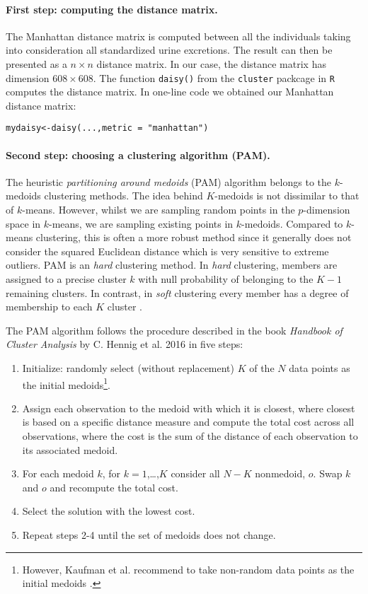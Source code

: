 \paragraph{First step: computing the distance matrix.}
The Manhattan distance matrix is computed between all the individuals taking into consideration all standardized urine excretions. The result can then be presented as a $n \times n$ distance matrix. In our case, the distance matrix has dimension $608 \times 608$. The function \texttt{daisy()} from the \texttt{cluster} packcage in \texttt{R} computes the distance matrix. In one-line code we obtained our Manhattan distance matrix:
\begin{verbatim}
mydaisy<-daisy(...,metric = "manhattan")
\end{verbatim}

\paragraph{Second step: choosing a clustering algorithm (PAM).}
The heuristic \emph{partitioning around medoids} (PAM) algorithm belongs to the $k$-medoids clustering methods. The idea behind $K$-medoids is not dissimilar to that of $k$-means. However, whilst we are sampling random points in the $p$-dimension space in $k$-means, we are sampling existing points in $k$-medoids. Compared to $k$-means clustering, this is often a more robust method since it generally does not consider the squared Euclidean distance which is very sensitive to extreme outliers. PAM is an \emph{hard} clustering method. In \emph{hard} clustering, members are assigned to a precise cluster $k$ with null probability of belonging to the $K-1$ remaining clusters. In contrast, in \emph{soft} clustering every member has a degree of membership to each $K$ cluster \cite{hennig_handbook_2016}.

\newpage

The PAM algorithm follows the procedure described in the book \emph{Handbook of Cluster Analysis} by C. Hennig et al. 2016 \cite{hennig_handbook_2016} in five steps:
\begin{displayquote}
\begin{enumerate}
\item Initialize: randomly select (without replacement) $K$ of the $N$ data points as the initial medoids\footnote{However, Kaufman et al. recommend to take non-random data points as the initial medoids \cite{kaufman_finding_1990}.}.
\item Assign each observation to the medoid with which it is closest, where closest is based on a specific distance measure and compute the total cost across all observations, where the cost is the sum of the distance of each observation to its associated medoid.
\item For each medoid $k$, for $k=1$,\dots ,$K$ consider all $N-K$ nonmedoid, $o$. Swap $k$ and $o$ and recompute the total cost.
\item Select the solution with the lowest cost.
\item Repeat steps 2-4 until the set of medoids does not change.
\end{enumerate}
\end{displayquote}

